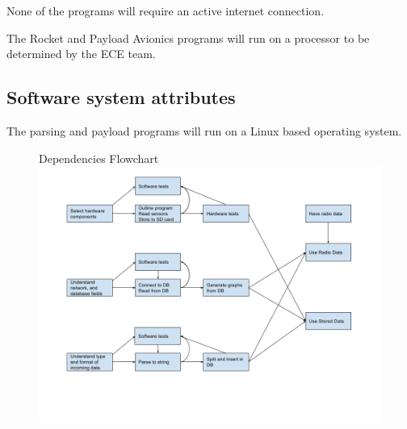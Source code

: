 \documentclass[onecolumn, draftclsnofoot, 10pt, compsoc]{IEEEtran}
\begin{document}
None of the programs will require an active internet connection.

The Rocket and Payload Avionics programs will run on a processor to be determined by the ECE team.

\subsection{Software system attributes}
The parsing and payload programs will run on a Linux based operating system.

\newpage
\begin{figure}
	\centering
    Dependencies Flowchart
	\includegraphics[scale=0.5]{dep_flowchart.png}
\end{figure}
\end{document}
